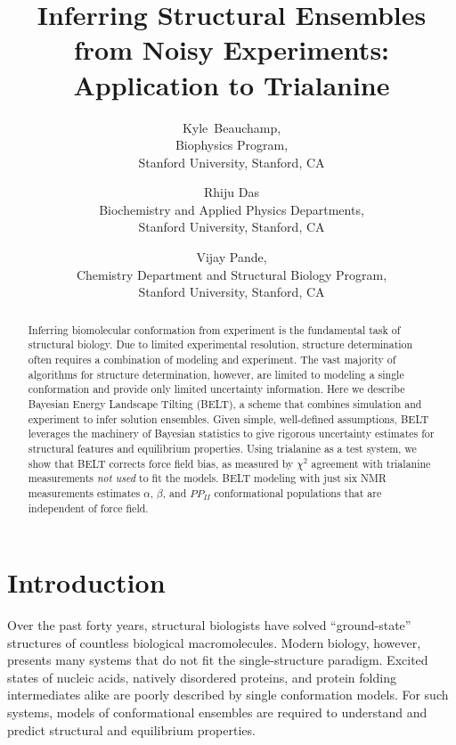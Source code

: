 \documentclass[11pt,titlepage]{article}
\author{Kyle~Beauchamp, \\
Biophysics Program, \\
Stanford University, Stanford, CA
\and Rhiju Das \\
Biochemistry and Applied Physics Departments, \\
Stanford University, Stanford, CA
\and Vijay Pande, \\
Chemistry Department and Structural Biology Program, \\
Stanford University, Stanford, CA
}
\title{Inferring Structural Ensembles from Noisy Experiments: Application to Trialanine}
\begin{document}
\maketitle

\begin{abstract}

Inferring biomolecular conformation from experiment is the fundamental task of structural biology.  Due to limited experimental resolution, structure determination often requires a combination of modeling and experiment.  The vast majority of algorithms for structure determination, however, are limited to modeling a single conformation and provide only limited uncertainty information.  Here we describe Bayesian Energy Landscape Tilting (BELT), a scheme that combines simulation and experiment to infer solution ensembles.  Given simple, well-defined assumptions, BELT leverages the machinery of Bayesian statistics to give rigorous uncertainty estimates for structural features and equilibrium properties.  Using trialanine as a test system, we show that BELT corrects force field bias, as measured by $\chi^2$ agreement with trialanine measurements \emph{not used} to fit the models.  BELT modeling with just six NMR measurements estimates $\alpha$, $\beta$, and $PP_{II}$ conformational populations that are 
independent of force field.  

\end{abstract}

\section*{Introduction}

Over the past forty years, structural biologists have solved ``ground-state'' structures of countless biological macromolecules\citep{Berman2000}. Modern biology, however, presents many systems that do not fit the single-structure paradigm.  Excited states of nucleic acids\citep{dethoff2012}, natively disordered proteins\citep{fink2005}, and protein folding intermediates\citep{korzhnev2004} alike are poorly described by single conformation models.  For such systems, models of conformational ensembles are required to understand and predict structural and equilibrium properties.  
\end{document}
